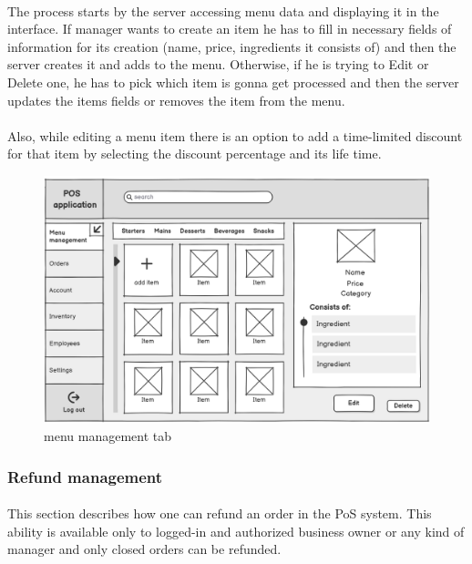 \documentclass{article}
\begin{document}
    \paragraph{}The process starts by the server accessing menu data and displaying it in the interface. If manager wants to create an item he has to fill in necessary fields of information for its creation (name, price, ingredients it consists of) and then the server creates it and adds to the menu. Otherwise, if he is trying to Edit or Delete one, he has to pick which item is gonna get processed and then the server updates the items fields or removes the item from the menu.
    \paragraph{}Also, while editing a menu item there is an option to add a time-limited discount for that item by selecting the discount percentage and its life time.
    \begin{figure}[H]
        \centering
        \includegraphics[width=0.9\linewidth]{PSP/lab-1/mockups/MenuManagement.png}
        \caption{menu management tab}
        \label{}
    \end{figure}
    
    \subsubsection{Refund management}
    \paragraph{}This section describes how one can refund an order in the PoS system. This ability is available only to logged-in and authorized business owner or any kind of manager and only closed orders can be refunded.
\end{document}
